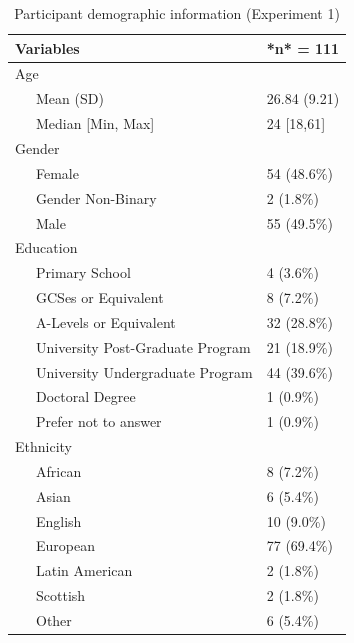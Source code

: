 \documentclass[
  donotrepeattitle,doc, 12pt, a4paper,floatsintext]{apa7}
\begin{document}
\begin{table}[tbp]

\begin{center}
\begin{threeparttable}

\caption{\label{tab:unnamed-chunk-5}Participant demographic information (Experiment 1)}

\small{

\begin{tabular}{ll}
\toprule
Variables & *n* = 111\\
\midrule
Age & \\
\ \ \ Mean (SD) & 26.84 (9.21)\\
\ \ \ Median [Min, Max] & 24 [18,61]\\
Gender & \\
\ \ \ Female & 54 (48.6\%)\\
\ \ \ Gender Non-Binary & 2 (1.8\%)\\
\ \ \ Male & 55 (49.5\%)\\
Education & \\
\ \ \ Primary School & 4 (3.6\%)\\
\ \ \ GCSes or Equivalent & 8 (7.2\%)\\
\ \ \ A-Levels or Equivalent & 32 (28.8\%)\\
\ \ \ University Post-Graduate Program & 21 (18.9\%)\\
\ \ \ University Undergraduate Program & 44 (39.6\%)\\
\ \ \ Doctoral Degree & 1 (0.9\%)\\
\ \ \ Prefer not to answer & 1 (0.9\%)\\
Ethnicity & \\
\ \ \ African & 8 (7.2\%)\\
\ \ \ Asian & 6 (5.4\%)\\
\ \ \ English & 10 (9.0\%)\\
\ \ \ European & 77 (69.4\%)\\
\ \ \ Latin American & 2 (1.8\%)\\
\ \ \ Scottish & 2 (1.8\%)\\
\ \ \ Other & 6 (5.4\%)\\
\bottomrule
\end{tabular}

}

\end{threeparttable}
\end{center}

\end{table}
\end{document}
